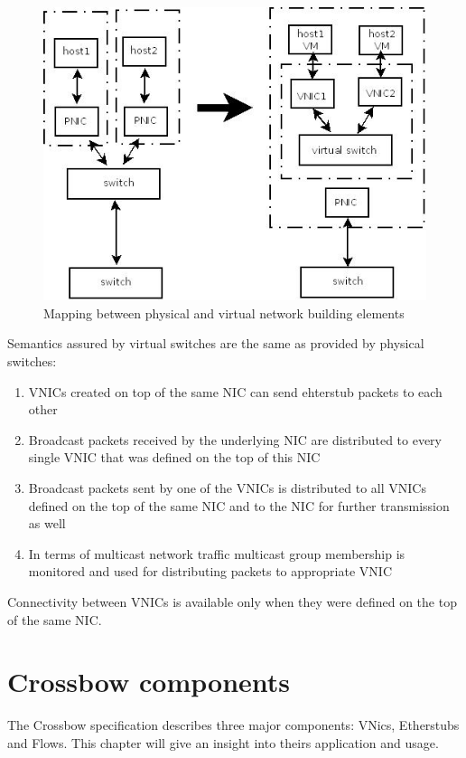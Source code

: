 \documentclass[11pt]{book}
\begin{document}
			\begin{figure}[H]
				\includegraphics[width=\textwidth]{img/physical_and_virtual_switches_mapping.jpeg}
				\caption{Mapping between physical and virtual network building elements}
			\end{figure}
			
			Semantics assured by virtual switches are the same as provided by physical switches: 
			\begin{enumerate}
				\item{VNICs created on top of the same NIC can send ehterstub packets to each other}
				\item{Broadcast packets received by the underlying NIC are distributed to every single VNIC that was defined on the top of this NIC}
				\item{Broadcast packets sent by one of the VNICs is distributed to all VNICs defined on the top of the same NIC and to the NIC for further transmission as well}
				\item{In terms of multicast network traffic multicast group membership is monitored and used for distributing packets to appropriate VNIC}
			\end{enumerate}

			Connectivity between VNICs is available only when they were defined on the top of the same NIC. 

		
	\section{Crossbow components}

                The Crossbow specification describes three major components: VNics, Etherstubs and Flows. This chapter will give an insight into theirs application and usage. 
\end{document}
